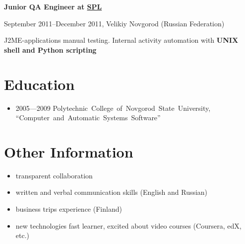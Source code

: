 {
\fontsize{12pt}{12pt}\selectfont
\bfseries Junior QA Engineer at
\href{http://spl.co}{\bfseries SPL\mdseries}
\mdseries
}

{
\fontsize{9pt}{8pt}\selectfont
September 2011--December 2011, Velikiy Novgorod (Russian Federation)
}

J2ME-applications manual testing. Internal activity automation with
\bfseries UNIX shell \mdseries and \bfseries Python \mdseries scripting

\section*{Education}
\begin{itemize}
\item 2005---2009 Polytechnic~College~of~Novgorod~State~University,
``Computer~and~Automatic~Systems~Software''
\end{itemize}

\section*{Other Information}
\begin{itemize}
\item transparent collaboration
\item written and verbal communication skills (English and Russian)
\item business trips experience (Finland)
\item new technologies fast learner, excited about video courses (Coursera, edX, etc.)
\end{itemize}

